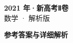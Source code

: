 \documentclass[zihao=-4, a4paper]{ctexart}
\begin{document}
\begin{center}
  {\Large\bfseries 2021 年·新高考Ⅱ卷}\\[4pt]
  {\large 数学 · 解析版}
\end{center}
\medskip
{}

\clearpage
{}
\begin{center}{\Large\bfseries 参考答案与详细解析}\end{center}
\medskip

\end{document}
